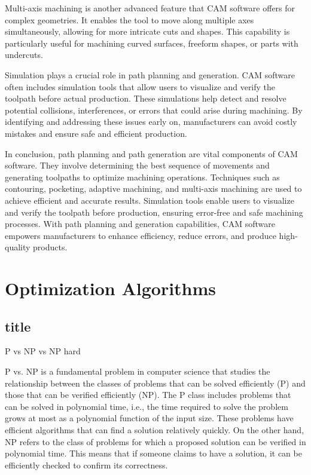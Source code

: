 Multi-axis machining is another advanced feature that CAM software offers for complex geometries. It enables the tool to move along multiple axes simultaneously, allowing for more intricate cuts and shapes. This capability is particularly useful for machining curved surfaces, freeform shapes, or parts with undercuts.

Simulation plays a crucial role in path planning and generation. CAM software often includes simulation tools that allow users to visualize and verify the toolpath before actual production. These simulations help detect and resolve potential collisions, interferences, or errors that could arise during machining. By identifying and addressing these issues early on, manufacturers can avoid costly mistakes and ensure safe and efficient production.

In conclusion, path planning and path generation are vital components of CAM software. They involve determining the best sequence of movements and generating toolpaths to optimize machining operations. Techniques such as contouring, pocketing, adaptive machining, and multi-axis machining are used to achieve efficient and accurate results. Simulation tools enable users to visualize and verify the toolpath before production, ensuring error-free and safe machining processes. With path planning and generation capabilities, CAM software empowers manufacturers to enhance efficiency, reduce errors, and produce high-quality products.
\section{Optimization Algorithms}%

\subsection{title}
P vs NP vs NP hard

P vs. NP is a fundamental problem in computer science that studies the relationship between the classes of problems that can be solved efficiently (P) and those that can be verified efficiently (NP). The P class includes problems that can be solved in polynomial time, i.e., the time required to solve the problem grows at most as a polynomial function of the input size. These problems have efficient algorithms that can find a solution relatively quickly. On the other hand, NP refers to the class of problems for which a proposed solution can be verified in polynomial time. This means that if someone claims to have a solution, it can be efficiently checked to confirm its correctness.

